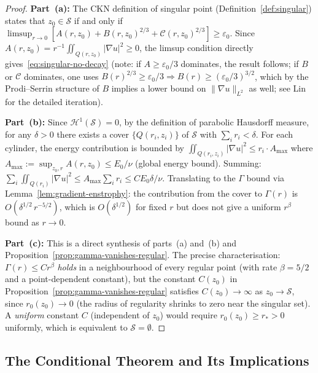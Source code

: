 \documentclass[11pt]{article}
\theoremstyle{definition}
\theoremstyle{remark}
\newcommand{\grad}{\nabla}
\begin{document}
\begin{proof}
\textbf{Part~(a):}
The CKN definition of singular point (Definition~\ref{def:singular}) states
that $z_0 \in \mathcal{S}$ if and only if
$\limsup_{r\to 0}[A(r,z_0) + B(r,z_0)^{2/3} + \mathcal{C}(r,z_0)^{2/3}]
\geq \varepsilon_0$.
Since $A(r,z_0) = r^{-1}\iint_{Q(r,z_0)}|\grad u|^2 \geq 0$,
the limsup condition directly gives~\eqref{eq:singular-no-decay}
(note: if $A \geq \varepsilon_0/3$ dominates, the result follows; if
$B$ or $\mathcal{C}$ dominates, one uses $B(r)^{2/3} \geq \varepsilon_0/3
\Rightarrow B(r) \geq (\varepsilon_0/3)^{3/2}$, which by the Prodi--Serrin
structure of $B$ implies a lower bound on $\|\grad u\|_{L^2}$ as well; see
Lin~\cite{Lin1998} for the detailed iteration).

\textbf{Part~(b):}
Since $\mathcal{H}^1(\mathcal{S}) = 0$, by the definition of parabolic
Hausdorff measure, for any $\delta > 0$ there exists a cover
$\{Q(r_i, z_i)\}$ of $\mathcal{S}$ with $\sum_i r_i < \delta$.
For each cylinder, the energy contribution is bounded by
$\iint_{Q(r_i, z_i)}|\grad u|^2 \leq r_i \cdot A_{\max}$
where $A_{\max} := \sup_{z_0, r} A(r, z_0) \leq E_0/\nu$ (global energy
bound).  Summing: $\sum_i \iint_{Q(r_i)}|\grad u|^2 \leq A_{\max}\sum_i r_i
\leq C E_0 \delta/\nu$.
Translating to the $\Gamma$ bound via Lemma~\ref{lem:gradient-enstrophy}:
the contribution from the cover to $\Gamma(r)$ is $O(\delta^{1/2}\,r^{-5/2})$,
which is $O(\delta^{1/2})$ for fixed $r$ but does not give a uniform
$r^\beta$ bound as $r \to 0$.

\textbf{Part~(c):}
This is a direct synthesis of parts~(a) and~(b) and
Proposition~\ref{prop:gamma-vanishes-regular}.
The precise characterisation: $\Gamma(r) \leq C r^\beta$ \emph{holds}
in a neighbourhood of every regular point (with rate $\beta = 5/2$ and
a point-dependent constant), but the constant $C(z_0)$ in
Proposition~\ref{prop:gamma-vanishes-regular} satisfies
$C(z_0) \to \infty$ as $z_0 \to \mathcal{S}$, since
$r_0(z_0) \to 0$ (the radius of regularity shrinks to zero near the
singular set).  A \emph{uniform} constant $C$ (independent of $z_0$)
would require $r_0(z_0) \geq r_* > 0$ uniformly, which is equivalent
to $\mathcal{S} = \emptyset$.
\end{proof}

\subsection{The Conditional Theorem and Its Implications}
\label{subsec:ckn-conditional}
\end{document}
